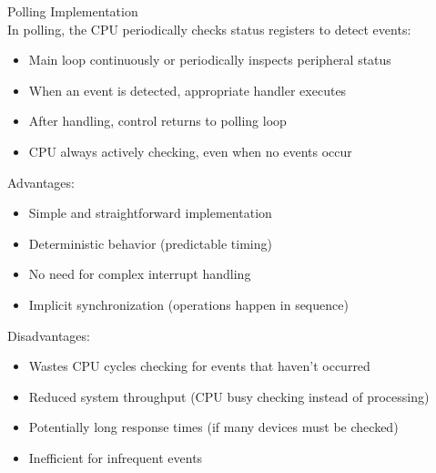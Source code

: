 \begin{concept}{Polling Implementation}\\
In polling, the CPU periodically checks status registers to detect events:
\begin{itemize}
    \item Main loop continuously or periodically inspects peripheral status
    \item When an event is detected, appropriate handler executes
    \item After handling, control returns to polling loop
    \item CPU always actively checking, even when no events occur
\end{itemize}

Advantages:
\begin{itemize}
    \item Simple and straightforward implementation
    \item Deterministic behavior (predictable timing)
    \item No need for complex interrupt handling
    \item Implicit synchronization (operations happen in sequence)
\end{itemize}

Disadvantages:
\begin{itemize}
    \item Wastes CPU cycles checking for events that haven't occurred
    \item Reduced system throughput (CPU busy checking instead of processing)
    \item Potentially long response times (if many devices must be checked)
    \item Inefficient for infrequent events
\end{itemize}
\end{concept}



